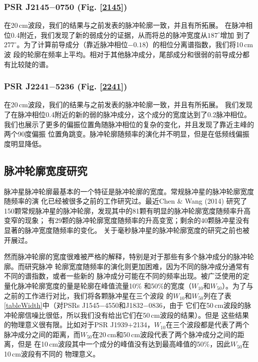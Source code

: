 \subsubsection{PSR J2145$-$0750 (Fig. \ref{2145})}

在20\,cm波段，我们的结果与之前发表的脉冲轮廓一致，并且有所拓展\supercite{Yan11a}。
在脉冲相位0.4附近，我们发现了新的弱成分的证据，从而将总的脉冲宽度从$187^{\circ}$增加
到了$277^{\circ}$。为了计算前导成分（靠近脉冲相位$-0.18$）的相位分离谱指数，我们将10\,cm波
段的轮廓在频率上平均。相对于其他脉冲成分，尾部成分和很弱的前导成分都有比较陡的谱。

\subsubsection{PSR J2241$-$5236 (Fig. \ref{2241})}

在20\,cm波段，我们的结果与之前发表的脉冲轮廓一致，并且有所拓展\supercite{Yan11a}。
我们发现了在脉冲相位0.4附近的新的弱的脉冲成分，这个成分的宽度达到了0.2脉冲相位。
我们也展示了更多的偏振位置角随脉冲相位的复杂的变化，并且发现了靠近主峰的两个90度偏振
位置角跳变。脉冲轮廓随频率的演化并不明显，但是在低频线偏振度明显降低。

\subsection{脉冲轮廓宽度研究}

脉冲星脉冲轮廓最基本的一个特征是脉冲轮廓的宽度。常规脉冲星的脉冲轮廓宽度随频率的演
化已经被很多之前的工作研究过\supercite{Cordes78,Thorsett91}。最近Chen \& Wang (2014)\supercite{Chen14}
研究了150颗常规脉冲星的脉冲轮廓，发现其中的81颗有明显的脉冲轮廓宽度随频率升高变窄的现象；
有29颗的脉冲轮廓宽度随频率的升高变宽；剩余的40颗脉冲星没有显著的脉冲宽度随频率的变化。
关于毫秒脉冲星的脉冲轮廓宽度的研究之前也被开展过\supercite{Kramer99}。

然而脉冲轮廓的宽度很难被严格的解释，特别是对于那些有多个脉冲成分的脉冲轮廓。而研究脉冲
轮廓宽度随频率的演化则更加困难，因为不同的脉冲成分通常有不同的谱指数，或者一些新的
脉冲成分可能在不同的频率出现。被广泛使用的定量化脉冲轮廓宽度的量是轮廓在峰值流量10\%
和50\%的宽度（$W_{10}$和$W_{50}$）。为了与之前的工作进行对比，我们将各颗脉冲星在三个波段
的$W_{10}$和$W_{50}$列在了表\ref{tableWidth}中（对PSRs J1545$-$4550和J1832$-$0836，由于
它们在50\,cm波段的脉冲轮廓信噪比很低，所以我们没有给出它们在50\,cm波段的结果）。但是
这些结果的物理意义很有限。比如对于PSR J1939$+$2134，$W_{10}$在三个波段都是代表了两个
脉冲成分之间的距离，而$W_{50}$在20\,cm和50\,cm波段代表了两个脉冲成分之间的距离，但是
在10\,cm波段其中一个成分的峰值没有达到最高峰值的50\%，因此$W_{50}$在10\,cm波段有不同的
物理意义。

